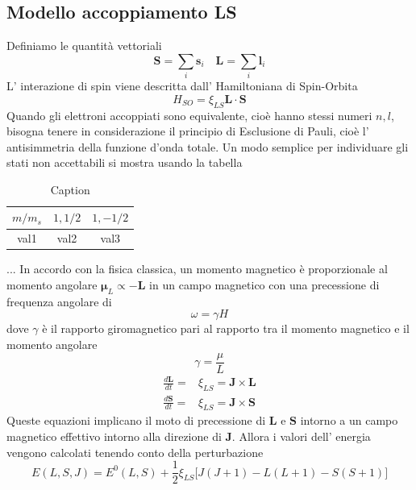 \subsection{Modello accoppiamento LS}
Definiamo le quantità vettoriali
\begin{equation*}
  \mathbf{S} = \sum_i \mathbf{s}_i \quad \mathbf{L} = \sum_i \mathbf{l}_i
\end{equation*}
L' interazione di spin viene descritta dall' Hamiltoniana di Spin-Orbita
\begin{equation*}
  H_{SO} = \xi_{LS} \mathbf{L}\cdot \mathbf{S}
\end{equation*}
Quando gli elettroni accoppiati sono equivalente, cioè hanno stessi numeri $n,l$, bisogna tenere in considerazione il principio di Esclusione di Pauli, cioè l' antisimmetria della funzione d'onda totale. Un modo semplice per individuare gli stati non accettabili si mostra usando la tabella
\begin{table}[ht]
    \centering
    \begin{tabular}{c || c || c }
        \toprule
        $m/m_s$ & $1,1/2$ & $1,-1/2$ \\
        \midrule
        val1 & val2 & val3 \\
        \bottomrule
    \end{tabular}
    \caption{Caption}
    \label{tab:label}
\end{table}
...
In accordo con la fisica classica, un momento magnetico è proporzionale al momento angolare $\mathbf{\mu}_L \propto -\mathbf{L}$ in un campo magnetico con una precessione di frequenza angolare di 
\begin{equation*}
  \omega = \gamma H
\end{equation*}
dove $\gamma$ è il rapporto giromagnetico pari al rapporto tra il momento magnetico e il momento angolare 
\begin{equation*}
  \gamma = \frac{\mu}{L}
\end{equation*}
\begin{align*}
  \frac{d\mathbf{L}}{dt} =& \xi_{LS} = \mathbf{J}\times\mathbf{L} \\
  \frac{d\mathbf{S}}{dt} =& \xi_{LS} = \mathbf{J}\times\mathbf{S} 
\end{align*}
Queste equazioni implicano il moto di precessione di $\mathbf{L}$ e $\mathbf{S}$ intorno a un campo magnetico effettivo intorno alla direzione di $\mathbf{J}$. Allora i valori dell' energia vengono calcolati tenendo conto della perturbazione 
\begin{equation*}
  E(L,S,J) = E^0(L,S)+ \frac{1}{2} \xi_{LS} \Big[J(J+1)-L(L+1)-S(S+1)\Big]
\end{equation*}



